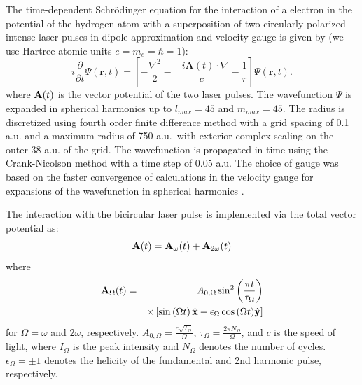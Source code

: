 

The time-dependent Schr\"odinger equation for the interaction of a electron in the potential of the hydrogen atom with a superposition of two circularly polarized intense laser pulses in dipole approximation and velocity gauge is given by (we use Hartree atomic units $e = m_e = \hbar =1$): 
%
\begin{equation}
i\frac{\partial}{\partial t}\Psi(\mathbf{r},t) = \left[-\frac{\nabla^2}{2} - \frac{-i\mathbf{A}(t) \cdot \nabla}{c}  - \frac{1}{r} \right]\Psi(\mathbf{r},t).
\end{equation}
%
where ${\bf A}(t)$ is the vector potential of the two laser pulses. The wavefunction $\Psi$ is expanded in spherical harmonics up to $l_{max} = 45$ and  $m_{max} = 45$. The radius is discretized using fourth order finite difference method with a grid spacing of 0.1 a.u. and a maximum radius of 750 a.u.\ with exterior complex scaling on the outer 38 a.u. of the grid. The wavefunction is propagated in time using the Crank-Nicolson method with a time step of 0.05 a.u. The choice of gauge was based on the faster convergence of calculations in the velocity gauge for expansions of the wavefunction in spherical harmonics \cite{cormier1996,han2010}. 

The interaction with the bicircular laser pulse is implemented via the total vector potential as:
\begin{equation}
{\bf A}(t) = {\bf A}_{\omega}(t) + {\bf A}_{2\omega}(t)
\end{equation}
where
\begin{eqnarray}
{\bf A}_\Omega(t) &=& A_{0,\Omega} \sin^2\left(\frac{\pi t}{\tau_{\Omega}}\right)
    \nonumber
      \\
      && \times \left[ 
      \sin\left(\Omega t \right) {\hat{\bf x} + \epsilon_{\Omega}\cos\left(\Omega t \right)} {\hat{\bf y}} \right]
\end{eqnarray}
for $\Omega = \omega$ and $2\omega$, respectively. $A_{0,\Omega} = \frac{c\sqrt{I_\Omega}}{\Omega}$, $\tau_{\Omega} = \frac{2\pi N_{\Omega}}{\Omega}$, and $c$ is the speed of light, where $I_{\Omega}$ is the peak intensity and $N_{\Omega}$ denotes the number of cycles. $\epsilon_{\Omega} = \pm 1$ denotes the helicity of the fundamental and 2nd harmonic pulse, respectively. 

